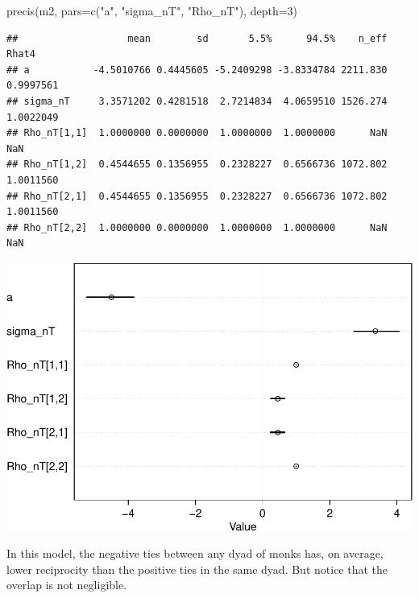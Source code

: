 \documentclass[
]{article}
\newenvironment{Shaded}{\begin{snugshade}}{\end{snugshade}}
\newcommand{\AttributeTok}[1]{\textcolor[rgb]{0.77,0.63,0.00}{#1}}
\newcommand{\DecValTok}[1]{\textcolor[rgb]{0.00,0.00,0.81}{#1}}
\newcommand{\FunctionTok}[1]{\textcolor[rgb]{0.00,0.00,0.00}{#1}}
\newcommand{\NormalTok}[1]{#1}
\newcommand{\OtherTok}[1]{\textcolor[rgb]{0.56,0.35,0.01}{#1}}
\newcommand{\SpecialCharTok}[1]{\textcolor[rgb]{0.00,0.00,0.00}{#1}}
\newcommand{\StringTok}[1]{\textcolor[rgb]{0.31,0.60,0.02}{#1}}
\begin{document}
\begin{Shaded}
\begin{Highlighting}[]
\FunctionTok{precis}\NormalTok{(m2, }\AttributeTok{pars=}\FunctionTok{c}\NormalTok{(}\StringTok{"a"}\NormalTok{, }\StringTok{"sigma\_nT"}\NormalTok{, }\StringTok{"Rho\_nT"}\NormalTok{), }\AttributeTok{depth=}\DecValTok{3}\NormalTok{)}
\end{Highlighting}
\end{Shaded}

\begin{verbatim}
##                   mean        sd       5.5%      94.5%    n_eff     Rhat4
## a           -4.5010766 0.4445605 -5.2409298 -3.8334784 2211.830 0.9997561
## sigma_nT     3.3571202 0.4281518  2.7214834  4.0659510 1526.274 1.0022049
## Rho_nT[1,1]  1.0000000 0.0000000  1.0000000  1.0000000      NaN       NaN
## Rho_nT[1,2]  0.4544655 0.1356955  0.2328227  0.6566736 1072.802 1.0011560
## Rho_nT[2,1]  0.4544655 0.1356955  0.2328227  0.6566736 1072.802 1.0011560
## Rho_nT[2,2]  1.0000000 0.0000000  1.0000000  1.0000000      NaN       NaN
\end{verbatim}

\begin{center}\includegraphics{Geraldes-week08_files/figure-latex/unnamed-chunk-10-1} \end{center}

In this model, the negative ties between any dyad of monks has, on
average, lower reciprocity than the positive ties in the same dyad. But
notice that the overlap is not negligible.

\begin{Shaded}
\end{Shaded}
\end{document}
